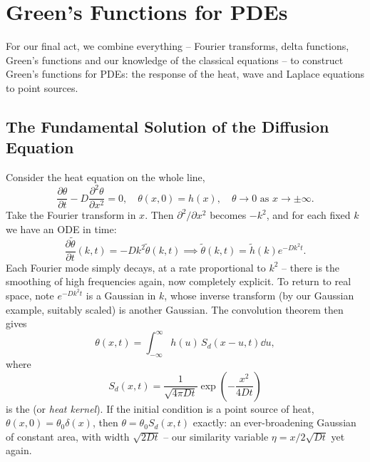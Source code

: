 \documentclass[a4paper]{scrartcl}
\begin{document}
\section{Green's Functions for PDEs}

For our final act, we combine everything -- Fourier transforms, delta functions, Green's functions and our knowledge of the classical equations -- to construct Green's functions for PDEs: the response of the heat, wave and Laplace equations to point sources.

\subsection{The Fundamental Solution of the Diffusion Equation}

Consider the heat equation on the whole line,
$$
\frac{\partial \theta}{\partial t} - D \frac{\partial^2 \theta}{\partial x^2} = 0, \quad \theta(x, 0) = h(x), \quad \theta \to 0 \text{ as } x \to \pm \infty.
$$
Take the Fourier transform in $x$. Then $\partial^2/\partial x^2$ becomes $-k^2$, and for each fixed $k$ we have an ODE in time:
$$
\frac{\partial \tilde{\theta}}{\partial t}(k, t) = -Dk^2 \tilde{\theta}(k, t) \implies \tilde{\theta}(k, t) = \tilde{h}(k) e^{-Dk^2 t}.
$$
Each Fourier mode simply decays, at a rate proportional to $k^2$ -- there is the smoothing of high frequencies again, now completely explicit. To return to real space, note $e^{-Dk^2t}$ is a Gaussian in $k$, whose inverse transform (by our Gaussian example, suitably scaled) is another Gaussian. The convolution theorem then gives
$$
\theta(x, t) = \int_{-\infty}^{\infty} h(u)\, S_d(x - u, t) \dd u,
$$
where
$$
S_d(x, t) = \frac{1}{\sqrt{4 \pi D t}} \exp \left(-\frac{x^2}{4Dt}\right)
$$
is the  (or \emph{heat kernel}). If the initial condition is a point source of heat, $\theta(x, 0) = \theta_0 \delta(x)$, then $\theta = \theta_0 S_d(x, t)$ exactly: an ever-broadening Gaussian of constant area, with width $\sqrt{2Dt}$ -- our similarity variable $\eta = x/2\sqrt{Dt}$ yet again.

\begin{center}
\end{center}
\end{document}
